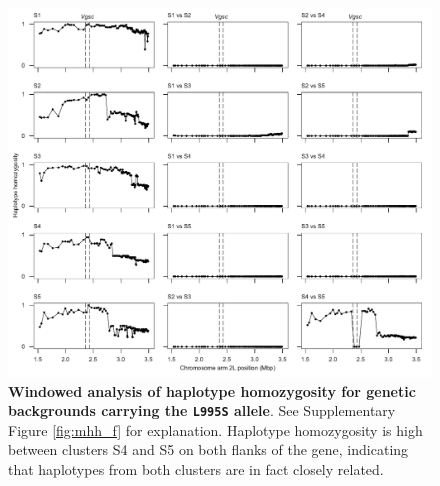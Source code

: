 \documentclass[a4paper,11pt,abstracton,hidelinks]{scrartcl}
\begin{document}
%
\begin{figure}[!b]
  \includegraphics[width=1.1\linewidth,center]{artwork/mhh_S.pdf}
  \caption{\textbf{Windowed analysis of haplotype homozygosity for genetic backgrounds carrying the \texttt{L995S} allele}. See Supplementary Figure \ref{fig:mhh_f} for explanation. Haplotype homozygosity is high between clusters S4 and S5 on both flanks of the gene, indicating that haplotypes from both clusters are in fact closely related.}
  \label{fig:mhh_s}
\end{figure}


\clearpage
\end{document}

